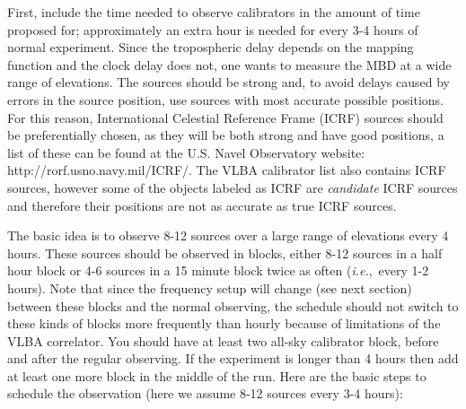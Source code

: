 \documentclass[preprint]{aastex}
\newcommand{\ie}{{\it i.e.},}
\begin{document}
First, include the time needed to observe
calibrators in the amount of time proposed for; approximately an extra
hour is needed for every 3-4 hours of normal experiment.
Since the tropospheric delay depends on the mapping function and
the clock delay does not, one wants to measure the MBD at
a wide range of elevations.  The sources should be strong and, to avoid delays
caused by errors in
the source position, use sources with most accurate possible positions.
For this reason,  International Celestial Reference Frame (ICRF) sources should be
preferentially chosen, as they will be both strong and have good positions, a
list of these can be found at the U.S. Navel
Observatory website: http://rorf.usno.navy.mil/ICRF/.  The VLBA calibrator
list also contains ICRF sources, however some of the objects labeled as
ICRF are {\it candidate} ICRF sources and therefore their positions
are not as accurate as true ICRF sources.

The basic idea is to observe 8-12 sources over a
large range of elevations every 4 hours.  These sources should be observed
in blocks, either 8-12 sources in a half hour block or 4-6 sources in a 15
minute block twice as often (\ie\ every 1-2 hours).  Note that since the
frequency setup will change (see next section) between these blocks and the
normal observing, the schedule should not switch to these kinds of blocks more
frequently than hourly because of limitations of the VLBA correlator.
You should have at least two
all-sky calibrator block, before and after the regular observing.  If the
experiment is longer than 4 hours then add at least one more block in the
middle of the run.
Here are the basic steps
to schedule the observation (here we assume 8-12 sources every 3-4 hours):
\end{document}

